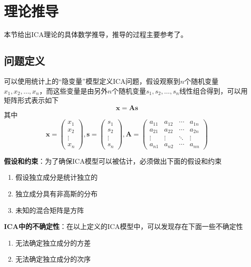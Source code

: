 \section{理论推导}

本节给出ICA理论的具体数学推导，推导的过程主要参考了\cite{icachinese,ica,fastica,icatutorial}。

\subsection{问题定义}
可以使用统计上的“隐变量”模型定义ICA问题，假设观察到$n$个随机变量$x_1,x_2,\ldots,x_n$，而这些变量是由另外$n$个随机变量$s_1,s_2,\ldots,s_n$线性组合得到，可以用矩阵形式表示如下
\begin{equation}
    \mathbf{x}=\mathbf{As}
\end{equation}
其中
\begin{equation}
    \mathbf{x}=\left(
        \begin{aligned}
        x_1\\
        x_2\\
        \vdots\\
        x_n
        \end{aligned}
    \right),
    \mathbf{s}=\left(
        \begin{aligned}
        s_1\\
        s_2\\
        \vdots\\
        s_n
        \end{aligned}
    \right),
    \mathbf{A}=\left(
        \begin{array}{cccc}
        a_{11} & a_{12} & \cdots & a_{1n} \\ 
        a_{21} & a_{22} & \cdots & a_{2n} \\ 
        \vdots & \vdots & \ddots & \vdots \\ 
        a_{n1} & a_{n2} & \cdots & a_{nn}
        \end{array} 
    \right)
\end{equation}

\textbf{假设和约束}：为了确保ICA模型可以被估计，必须做出下面的假设和约束
\begin{enumerate}
    \item 假设独立成分是统计独立的
    \item 独立成分具有非高斯的分布
    \item 未知的混合矩阵是方阵
\end{enumerate}

\textbf{ICA中的不确定性}：在以上定义的ICA模型中，可以发现存在下面一些不确定性
\begin{enumerate}
    \item 无法确定独立成分的方差
    \item 无法确定独立成分的次序
\end{enumerate}

